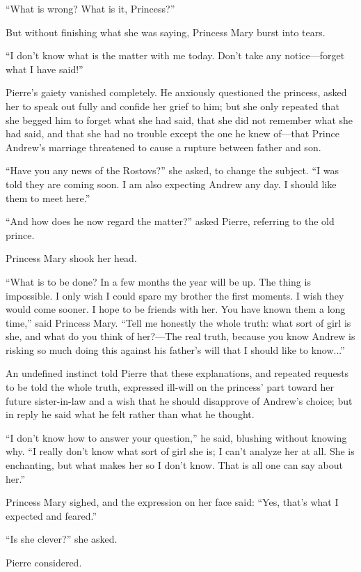 ``What is wrong? What is it, Princess?''

But without finishing what she was saying, Princess Mary burst
into tears.

``I don't know what is the matter with me today. Don't take any
notice---forget what I have said!''

Pierre's gaiety vanished completely. He anxiously questioned the
princess, asked her to speak out fully and confide her grief to
him; but she only repeated that she begged him to forget what she
had said, that she did not remember what she had said, and that
she had no trouble except the one he knew of---that Prince
Andrew's marriage threatened to cause a rupture between father
and son.

``Have you any news of the Rostovs?'' she asked, to change the
subject. ``I was told they are coming soon. I am also expecting
Andrew any day. I should like them to meet here.''

``And how does he now regard the matter?'' asked Pierre,
referring to the old prince.

Princess Mary shook her head.

``What is to be done? In a few months the year will be up. The
thing is impossible. I only wish I could spare my brother the
first moments. I wish they would come sooner. I hope to be
friends with her. You have known them a long time,'' said
Princess Mary. ``Tell me honestly the whole truth: what sort of
girl is she, and what do you think of her?---The real truth,
because you know Andrew is risking so much doing this against his
father's will that I should like to know...''

An undefined instinct told Pierre that these explanations, and
repeated requests to be told the whole truth, expressed ill-will
on the princess' part toward her future sister-in-law and a wish
that he should disapprove of Andrew's choice; but in reply he
said what he felt rather than what he thought.

``I don't know how to answer your question,'' he said, blushing
without knowing why. ``I really don't know what sort of girl she
is; I can't analyze her at all. She is enchanting, but what makes
her so I don't know. That is all one can say about her.''

Princess Mary sighed, and the expression on her face said: ``Yes,
that's what I expected and feared.''

``Is she clever?'' she asked.

Pierre considered.

